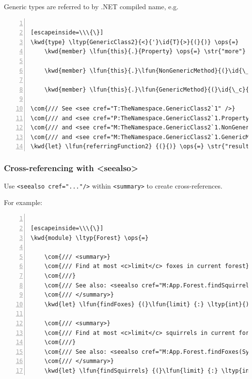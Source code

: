 \documentclass{article}
\newcommand{\id}[1]{\textcolor{black}{#1}}
\newcommand{\com}[1]{\textcolor{officegreen}{#1}}
\newcommand{\kwd}[1]{\textcolor{navy}{#1}}
\newcommand{\ops}[1]{\textcolor{purple}{#1}}
\newcommand{\str}[1]{\textcolor{olive}{#1}}
\begin{document}
Generic types are referred to by .NET compiled name, e.g.
\begin{lstlisting}[numbers=left]

[escapeinside=\\\{\}]
\kwd{type} \ltyp{GenericClass2}{<}{'}\id{T}{>}{(}{)} \ops{=}
    \kwd{member} \lfun{this}{.}{Property} \ops{=} \str{"more"}

    \kwd{member} \lfun{this}{.}\lfun{NonGenericMethod}{(}\id{\_c}{:} {'}\id{T}{)} \ops{=} \str{"more"}

    \kwd{member} \lfun{this}{.}\lfun{GenericMethod}{(}\id{\_c}{:} {'}\id{T}{,} \id{\_o}{:} {'}\id{U}{)} \ops{=} \str{"more"}

\com{/// See <see cref="T:TheNamespace.GenericClass2`1" />}
\com{/// and <see cref="P:TheNamespace.GenericClass2`1.Property" />}
\com{/// and <see cref="M:TheNamespace.GenericClass2`1.NonGenericMethod(`0)" />}
\com{/// and <see cref="M:TheNamespace.GenericClass2`1.GenericMethod``1(`0,``0)" />}
\kwd{let} \lfun{referringFunction2} {(}{)} \ops{=} \str{"result"}

\end{lstlisting}

\subsubsection*{Cross-referencing with <seealso>}



Use \texttt{<seealso cref="..."/>} within \texttt{<summary>} to create cross-references.


For example:
\begin{lstlisting}[numbers=left]

[escapeinside=\\\{\}]
\kwd{module} \ltyp{Forest} \ops{=}

    \com{/// <summary>}
    \com{/// Find at most <c>limit</c> foxes in current forest}
    \com{///}
    \com{/// See also: <seealso cref="M:App.Forest.findSquirrels(System.Int32)"/>}
    \com{/// </summary>}
    \kwd{let} \lfun{findFoxes} {(}\lfun{limit} {:} \ltyp{int}{)} \ops{=} {[}{]}

    \com{/// <summary>}
    \com{/// Find at most <c>limit</c> squirrels in current forest}
    \com{///}
    \com{/// See also: <seealso cref="M:App.Forest.findFoxes(System.Int32)"/>}
    \com{/// </summary>}
    \kwd{let} \lfun{findSquirrels} {(}\lfun{limit} {:} \ltyp{int}{)} \ops{=} {[}{]}

\end{lstlisting}
\end{document}
